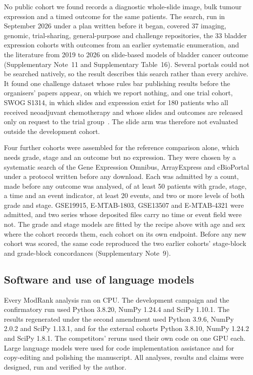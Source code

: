 \documentclass[pdflatex,sn-nature]{sn-jnl}
\begin{document}
No public cohort we found records a diagnostic whole-slide image, bulk tumour expression and a timed
outcome for the same patients. The search, run in September 2026 under a plan written before it
began, covered 37 imaging, genomic, trial-sharing, general-purpose and challenge repositories, the 33
bladder expression cohorts with outcomes from an earlier systematic enumeration, and the literature
from 2019 to 2026 on slide-based models of bladder cancer outcome (Supplementary Note~11 and Supplementary Table~16). Several
portals could not be searched natively, so the result describes this search rather than every
archive. It found one challenge dataset whose rules bar publishing results before the organisers'
papers appear, on which we report nothing, and one trial cohort, SWOG S1314, in which slides and
expression exist for 180 patients who all received neoadjuvant chemotherapy and whose slides and
outcomes are released only on request to the trial group~\citep{flaig2021s1314,bai2025gmlf}. The
slide arm was therefore not evaluated outside the development cohort.

Four further cohorts were assembled for the reference comparison alone, which needs grade, stage and
an outcome but no expression. They were chosen by a systematic search of the Gene Expression Omnibus,
ArrayExpress and cBioPortal under a protocol written before any download. Each was admitted by a count,
made before any outcome was analysed, of at least 50 patients with grade, stage, a time and an event
indicator, at least 20 events, and two or more levels of both grade and stage. GSE19915,
E-MTAB-1803, GSE13507 and E-MTAB-4321 were admitted, and two series whose deposited files carry no time
or event field were not. The grade and stage models are fitted by the recipe above with age and sex
where the cohort records them, each cohort on its own endpoint. Before any new cohort was scored, the
same code reproduced the two earlier cohorts' stage-block and grade-block concordances
(Supplementary Note~9).

\subsection*{Software and use of language models}

Every ModRank analysis ran on CPU. The development campaign and the confirmatory run used Python
3.8.20, NumPy 1.24.4 and SciPy 1.10.1. The results regenerated under the second amendment used
Python 3.9.6, NumPy 2.0.2 and SciPy 1.13.1, and for the external cohorts Python 3.8.10, NumPy 1.24.2
and SciPy 1.8.1. The competitors' reruns used their own code on one GPU each. Large language
models were used for code implementation assistance and for copy-editing and polishing the manuscript.
All analyses, results and claims were designed, run and verified by the author.
\end{document}
